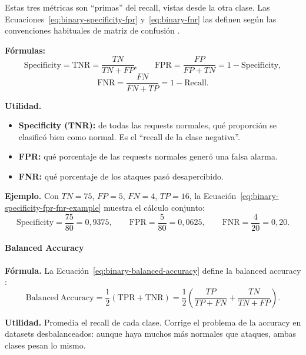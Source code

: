 \documentclass[12pt,oneside]{report}
\begin{document}
Estas tres métricas son ``primas'' del recall, vistas desde la otra clase. Las Ecuaciones~\eqref{eq:binary-specificity-fpr} y~\eqref{eq:binary-fnr} las definen según las convenciones habituales de matriz de confusión \cite{sokolova_lapalme_2009}.

\textbf{Fórmulas:}
\begin{equation}
\label{eq:binary-specificity-fpr}
\mathrm{Specificity}=\mathrm{TNR}=\frac{TN}{TN+FP},\qquad
\mathrm{FPR}=\frac{FP}{FP+TN}=1-\mathrm{Specificity},
\end{equation}
\begin{equation}
\label{eq:binary-fnr}
\mathrm{FNR}=\frac{FN}{FN+TP}=1-\mathrm{Recall}.
\end{equation}

\textbf{Utilidad.}
\begin{itemize}[leftmargin=*]
  \item \textbf{Specificity (TNR):} de todas las requests normales, qué
  proporción se clasificó bien como normal. Es el ``recall de la clase
  negativa''.
  \item \textbf{FPR:} qué porcentaje de las requests normales generó una
  falsa alarma.
  \item \textbf{FNR:} qué porcentaje de los ataques pasó desapercibido.
\end{itemize}

\textbf{Ejemplo.} Con $TN=75$, $FP=5$, $FN=4$, $TP=16$, la Ecuación~\eqref{eq:binary-specificity-fpr-fnr-example} muestra el cálculo conjunto:
\begin{equation}
\label{eq:binary-specificity-fpr-fnr-example}
\mathrm{Specificity}=\frac{75}{80}=0{,}9375,\qquad
\mathrm{FPR}=\frac{5}{80}=0{,}0625,\qquad
\mathrm{FNR}=\frac{4}{20}=0{,}20.
\end{equation}

\paragraph{Balanced Accuracy}

\textbf{Fórmula.} La Ecuación~\eqref{eq:binary-balanced-accuracy} define la balanced accuracy \cite{brodersen2010}:
\begin{equation}
\label{eq:binary-balanced-accuracy}
\mathrm{Balanced\ Accuracy}=\frac{1}{2}\left(\mathrm{TPR}+\mathrm{TNR}\right)
=\frac{1}{2}\left(\frac{TP}{TP+FN}+\frac{TN}{TN+FP}\right).
\end{equation}

\textbf{Utilidad.} Promedia el recall de cada clase. Corrige el problema
de la accuracy en datasets desbalanceados: aunque haya muchos más
normales que ataques, ambas clases pesan lo mismo.
\end{document}
